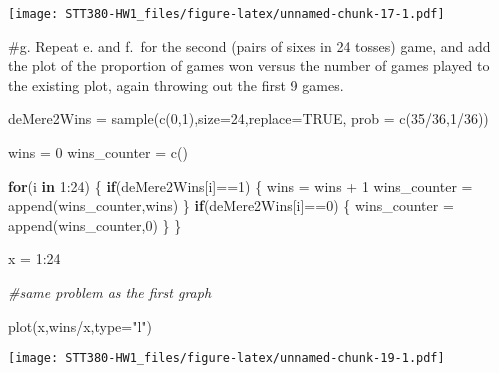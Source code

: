 \documentclass[
]{article}
\newenvironment{Shaded}{\begin{snugshade}}{\end{snugshade}}
\newcommand{\AttributeTok}[1]{\textcolor[rgb]{0.77,0.63,0.00}{#1}}
\newcommand{\CommentTok}[1]{\textcolor[rgb]{0.56,0.35,0.01}{\textit{#1}}}
\newcommand{\ConstantTok}[1]{\textcolor[rgb]{0.00,0.00,0.00}{#1}}
\newcommand{\ControlFlowTok}[1]{\textcolor[rgb]{0.13,0.29,0.53}{\textbf{#1}}}
\newcommand{\DecValTok}[1]{\textcolor[rgb]{0.00,0.00,0.81}{#1}}
\newcommand{\FunctionTok}[1]{\textcolor[rgb]{0.00,0.00,0.00}{#1}}
\newcommand{\NormalTok}[1]{#1}
\newcommand{\OtherTok}[1]{\textcolor[rgb]{0.56,0.35,0.01}{#1}}
\newcommand{\SpecialCharTok}[1]{\textcolor[rgb]{0.00,0.00,0.00}{#1}}
\newcommand{\StringTok}[1]{\textcolor[rgb]{0.31,0.60,0.02}{#1}}
\begin{document}
\texttt{[image: STT380-HW1\_files/figure-latex/unnamed-chunk-17-1.pdf]}

\#g. Repeat e. and f.~for the second (pairs of sixes in 24 tosses) game,
and add the plot of the proportion of games won versus the number of
games played to the existing plot, again throwing out the first 9 games.

\begin{Shaded}
\begin{Highlighting}[]
\NormalTok{deMere2Wins }\OtherTok{=} \FunctionTok{sample}\NormalTok{(}\FunctionTok{c}\NormalTok{(}\DecValTok{0}\NormalTok{,}\DecValTok{1}\NormalTok{),}\AttributeTok{size=}\DecValTok{24}\NormalTok{,}\AttributeTok{replace=}\ConstantTok{TRUE}\NormalTok{, }\AttributeTok{prob =} \FunctionTok{c}\NormalTok{(}\DecValTok{35}\SpecialCharTok{/}\DecValTok{36}\NormalTok{,}\DecValTok{1}\SpecialCharTok{/}\DecValTok{36}\NormalTok{))}

\NormalTok{wins }\OtherTok{=} \DecValTok{0}
\NormalTok{wins\_counter }\OtherTok{=} \FunctionTok{c}\NormalTok{()}

\ControlFlowTok{for}\NormalTok{(i }\ControlFlowTok{in} \DecValTok{1}\SpecialCharTok{:}\DecValTok{24}\NormalTok{)}
\NormalTok{\{}
  \ControlFlowTok{if}\NormalTok{(deMere2Wins[i]}\SpecialCharTok{==}\DecValTok{1}\NormalTok{)}
\NormalTok{  \{}
\NormalTok{    wins }\OtherTok{=}\NormalTok{ wins }\SpecialCharTok{+} \DecValTok{1}
\NormalTok{    wins\_counter }\OtherTok{=} \FunctionTok{append}\NormalTok{(wins\_counter,wins)}
\NormalTok{  \}}
  \ControlFlowTok{if}\NormalTok{(deMere2Wins[i]}\SpecialCharTok{==}\DecValTok{0}\NormalTok{)}
\NormalTok{  \{}
\NormalTok{    wins\_counter }\OtherTok{=} \FunctionTok{append}\NormalTok{(wins\_counter,}\DecValTok{0}\NormalTok{)}
\NormalTok{  \}}
\NormalTok{\}}
\end{Highlighting}
\end{Shaded}

\begin{Shaded}
\begin{Highlighting}[]
\NormalTok{x }\OtherTok{=} \DecValTok{1}\SpecialCharTok{:}\DecValTok{24}

\CommentTok{\#same problem as the first graph}

\FunctionTok{plot}\NormalTok{(x,wins}\SpecialCharTok{/}\NormalTok{x,}\AttributeTok{type=}\StringTok{"l"}\NormalTok{)}
\end{Highlighting}
\end{Shaded}

\texttt{[image: STT380-HW1\_files/figure-latex/unnamed-chunk-19-1.pdf]}
\end{document}
